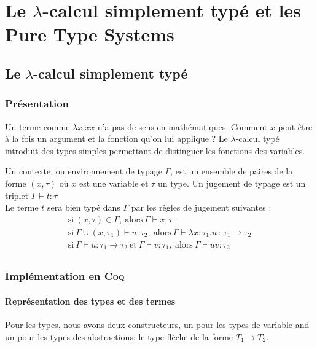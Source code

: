 \chapter{Le $\lambda$-calcul simplement typé et les Pure Type Systems}

\section{Le $\lambda$-calcul simplement typé}
\subsection{Présentation}
Un terme comme $\lambda x.xx$ n'a pas de sens en mathématiques. Comment $x$ peut être à la fois un argument et la fonction qu'on
lui applique ? Le $\lambda$-calcul typé introduit des types simples permettant de distinguer les fonctions des variables.

Un contexte, ou environnement de typage $\Gamma$, est un ensemble de paires de la forme 
$( x , \tau )$  où $x$ est une variable et $\tau$ un type.
 Un jugement de typage est un triplet $\Gamma \vdash t:\tau$  \\

 Le terme $t$ sera bien typé dans $\Gamma$  par les règles de jugement suivantes :
\begin{gather*}
  \mathrm{si}\ (x,\tau ) \in \Gamma  ,\  \mathrm{alors}\ \Gamma \vdash x:\tau  \\
  \mathrm{si}\  \Gamma \cup (x,\tau _{1})\vdash u:\tau _{2},\  \mathrm{alors}\ \Gamma \vdash \lambda x\!:\!\tau _{1}.u\,:\,\tau _{1}\rightarrow \tau _{2} \\
  \mathrm{si}\ \Gamma \vdash u:\tau _{1}\rightarrow \tau _{2}\ \mathrm{et}\ \Gamma \vdash v:\tau _{1},\  
    \mathrm{alors}\  \Gamma \vdash uv:\tau _{2} \\ 
\end{gather*}

\subsection{Implémentation en \textsc{Coq}}
\subsubsection{Représentation des types et des termes}
Pour les types, nous avons deux constructeurs, un pour les types de variable and un
 pour les types des abstractions: le type flèche de la forme  $T_1 \rightarrow T_2$.

